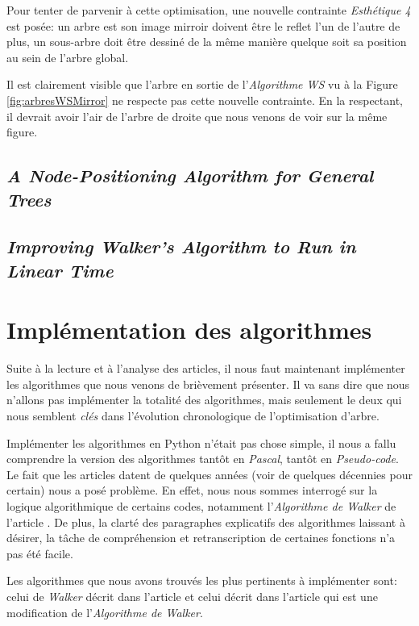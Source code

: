 \documentclass{article}
\begin{document}
  Pour tenter de parvenir à cette optimisation, une nouvelle contrainte \emph{Esthétique 4} est posée: un arbre est son image mirroir doivent être le reflet l'un de l'autre de plus, un sous-arbre doit être dessiné de la même manière quelque soit sa position au sein de l'arbre global.

  Il est clairement visible que l'arbre en sortie de l'\emph{Algorithme WS} vu à la Figure \ref{fig:arbresWSMirror} ne respecte pas cette nouvelle contrainte. En la respectant, il devrait avoir l'air de l'arbre de droite que nous venons de voir sur la même figure.




  \subsection{\emph{A Node-Positioning Algorithm for General Trees}}
  \subsection{\emph{Improving Walker’s Algorithm to Run in Linear Time}}


\newpage
\section{Implémentation des algorithmes}

Suite à la lecture et à l'analyse des articles, il nous faut maintenant implémenter les algorithmes que nous venons de brièvement présenter. Il va sans dire que nous n'allons pas implémenter la totalité des algorithmes, mais seulement le deux qui nous semblent \emph{clés} dans l'évolution chronologique de l'optimisation d'arbre.

Implémenter les algorithmes en Python n'était pas chose simple, il nous a fallu comprendre la version des algorithmes tantôt en \emph{Pascal}, tantôt en \emph{Pseudo-code}. Le fait que les articles datent de quelques années (voir de quelques décennies pour certain) nous a posé problème. En effet, nous nous sommes interrogé sur la logique algorithmique de certains codes, notamment l'\emph{Algorithme de Walker} de l'article \cite{article90}. De plus, la clarté des paragraphes explicatifs des algorithmes laissant à désirer, la tâche de compréhension et retranscription de certaines fonctions n'a pas été facile.

Les algorithmes que nous avons trouvés les plus pertinents à implémenter sont: celui de \emph{Walker} décrit dans l'article \cite{article90} et celui décrit dans l'article \cite{article02} qui est une modification de l'\emph{Algorithme de Walker}.
\end{document}
